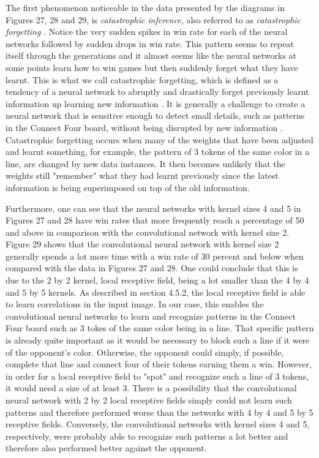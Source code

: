 \documentclass[titlepage]{article}
\begin{document}
\vskip 0.2cm

\noindent
The first phenomenon noticeable in the data presented by the diagrams in Figures 27, 28 and 29, is \emph{catastrophic inference}, also referred to as \emph{catastrophic forgetting} \cite{catastrophic}. Notice the very sudden spikes in win rate for each of the neural networks followed by sudden drops in win rate. This pattern seems to repeat itself through the generations and it almost seems like the neural networks at some points learn how to win games but then suddenly forget what they have learnt. This is what we call catastrophic forgetting, which is defined as a tendency of a neural network to abruptly and drastically forget previously learnt information up learning new information \cite{catastrophic}. It is generally a challenge to create a neural network that is sensitive enough to detect small details, such as patterns in the Connect Four board, without being disrupted by new information \cite{catastrophic}. Catastrophic forgetting occurs when many of the weights that have been adjusted and learnt something, for example, the pattern of 3 tokens of the same color in a line, are changed by new data instances. It then becomes unlikely that the weights still "remember" what they had learnt previously since the latest information is being superimposed on top of the old information.

\vskip 0.2cm

\noindent
Furthermore, one can see that the neural networks with kernel sizes 4 and 5 in Figures 27 and 28 have win rates that more frequently reach a percentage of 50 and above in comparison with the convolutional network with kernel size 2. Figure 29 shows that the convolutional neural network with kernel size 2 generally spends a lot more time with a win rate of 30 percent and below when compared with the data in Figures 27 and 28. One could conclude that this is due to the 2 by 2 kernel, local receptive field, being a lot smaller than the 4 by 4 and 5 by 5 kernels. As described in section 4.5.2, the local receptive field is able to learn correlations in the input image. In our case, this enables the convolutional neural networks to learn and recognize patterns in the Connect Four board such as 3 tokes of the same color being in a line. That specific pattern is already quite important as it would be necessary to block such a line if it were of the opponent's color. Otherwise, the opponent could simply, if possible, complete that line and connect four of their tokens earning them a win. However, in order for a local receptive field to "spot" and recognize such a line of 3 tokens, it would need a size of at least 3. There is a possibility that the convolutional neural network with 2 by 2 local receptive fields simply could not learn such patterns and therefore performed worse than the networks with 4 by 4 and 5 by 5 receptive fields. Conversely, the convolutional networks with kernel sizes 4 and 5, respectively, were probably able to recognize such patterns a lot better and therefore also performed better against the opponent.
\end{document}
